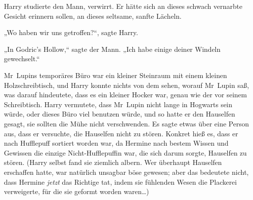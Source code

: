 Harry studierte den Mann, verwirrt. Er hätte sich an dieses schwach vernarbte Gesicht erinnern sollen, an dieses seltsame, sanfte Lächeln.

„Wo haben wir uns getroffen?“, sagte Harry.

„In Godric's Hollow,“ sagte der Mann. „Ich habe einige deiner Windeln gewechselt.“

\later

Mr~Lupins temporäres Büro war ein kleiner Steinraum mit einem kleinen Holzschreibtisch, und Harry konnte nichts von dem sehen, worauf Mr~Lupin saß, was darauf hindeutete, dass es ein kleiner Hocker war, genau wie der vor seinem Schreibtisch. Harry vermutete, dass Mr~Lupin nicht lange in Hogwarts sein würde, oder dieses Büro viel benutzen würde, und so hatte er den Hauselfen gesagt, sie sollten die Mühe nicht verschwenden. Es sagte etwas über eine Person aus, dass er versuchte, die Hauselfen nicht zu stören. Konkret hieß es, dass er nach Hufflepuff sortiert worden war, da Hermine nach bestem Wissen und Gewissen die einzige Nicht-Hufflepuffin war, die sich darum sorgte, Hauselfen zu stören. (Harry selbst fand sie ziemlich albern. Wer überhaupt Hauselfen erschaffen hatte, war natürlich unsagbar böse gewesen; aber das bedeutete nicht, dass Hermine \emph{jetzt} das Richtige tat, indem sie fühlenden Wesen die Plackerei verweigerte, für die sie geformt worden waren…)

